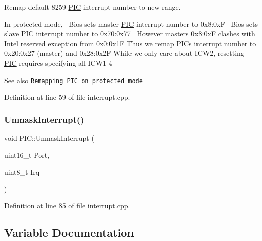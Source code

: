 Remap default 8259 \hyperlink{namespace_p_i_c}{P\+IC} interrupt number to new range. 

In protected mode,~\newline
Bios sets master \hyperlink{namespace_p_i_c}{P\+IC} interrupt number to 0x8\+:0xF~\newline
Bios sets slave \hyperlink{namespace_p_i_c}{P\+IC} interrupt number to 0x70\+:0x77~\newline
However master\textquotesingle{}s 0x8\+:0xF clashes with Intel reserved exception from 0x0\+:0x1F Thus we remap \hyperlink{namespace_p_i_c}{P\+IC}\textquotesingle{}s interrupt number to 0x20\+:0x27 (master) and 0x28\+:0x2F While we only care about I\+C\+W2, resetting \hyperlink{namespace_p_i_c}{P\+IC} requires specifying all I\+C\+W1-\/4 \begin{DoxySeeAlso}{See also}
\href{https://wiki.osdev.org/8259_PIC#Protected_Mode}{\tt Remapping P\+IC on protected mode} 
\end{DoxySeeAlso}


Definition at line 59 of file interrupt.\+cpp.

\mbox{\label{namespace_p_i_c_ad6f2cca6611cd7992992ab7705d6c25f}} 
\subsubsection{\texorpdfstring{Unmask\+Interrupt()}{UnmaskInterrupt()}}
{\footnotesize\ttfamily void P\+I\+C\+::\+Unmask\+Interrupt (\begin{DoxyParamCaption}\item[{uint16\+\_\+t}]{Port,  }\item[{uint8\+\_\+t}]{Irq }\end{DoxyParamCaption})}



Definition at line 85 of file interrupt.\+cpp.



\subsection{Variable Documentation}
\mbox{\label{namespace_p_i_c_aa3b99beaed95a8a51f1e855723e05d48}} 
